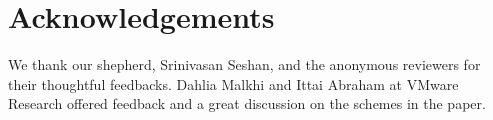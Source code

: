 \section*{Acknowledgements}
We thank our shepherd, Srinivasan Seshan, and the anonymous reviewers for their thoughtful feedbacks. Dahlia Malkhi and Ittai Abraham at VMware Research offered feedback and a great discussion on the schemes in the paper.